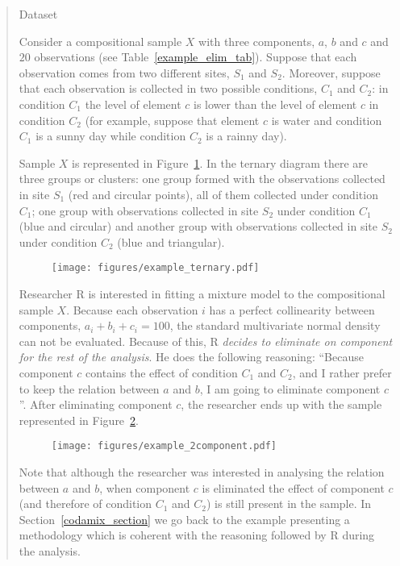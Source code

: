 \documentclass[10pt, a4paper]{article}
\begin{document}
\begin{quote}
\begin{table}
\centering
\scriptsize

\caption{Dataset}
\label{example_elim_tab}
\end{table}

Consider a compositional sample $X$ with three components, $a$, $b$ and $c$ and $20$ observations (see Table~\ref{example_elim_tab}). Suppose that each observation comes from two different sites, $S_1$ and $S_2$. Moreover, suppose that each observation is collected in two possible conditions, $C_1$ and $C_2$: in condition $C_1$ the level of element $c$ is lower than the level of element $c$ in condition $C_2$ (for example, suppose that element $c$ is water and condition $C_1$ is a sunny day while condition $C_2$ is a rainny day).

Sample $X$ is represented in Figure~\ref{example_elim_component}. In the ternary diagram there are three groups or clusters: one group formed with the observations collected in site $S_1$ (red and circular points), all of them collected under condition $C_1$; one group with observations collected in site $S_2$ under condition $C_1$ (blue and circular) and another group with observations collected in site $S_2$ under condition $C_2$ (blue and triangular).

\begin{figure}[thbp]
\centering
\texttt{[image: figures/example\_ternary.pdf]}
\caption{}\label{example_elim_component}
\end{figure}

Researcher R is interested in fitting a mixture model to the compositional sample $X$. Because each observation $i$ has a perfect collinearity between components, $a_i+b_i+c_i = 100$, the standard multivariate normal density can not be evaluated. Because of this, R \emph{decides to eliminate on component for the rest of the analysis}. He does the following reasoning: ``Because component $c$ contains the effect of condition $C_1$ and $C_2$, and I rather prefer to keep the relation between $a$ and $b$, I am going to eliminate component $c$''. After eliminating component $c$, the researcher ends up with the sample represented in Figure~\ref{example_elim_2_components}.

\begin{figure}[thbp]
\centering
\texttt{[image: figures/example\_2component.pdf]}
\caption{}\label{example_elim_2_components}
\end{figure}

Note that although the researcher was interested in analysing the relation between $a$ and $b$, when component $c$ is eliminated the effect of component $c$ (and therefore of condition $C_1$ and $C_2$) is still present in the sample. In Section~\ref{codamix_section} we go back to the example presenting a methodology which is coherent with the reasoning followed by R during the analysis.

\end{quote}
\end{document}
